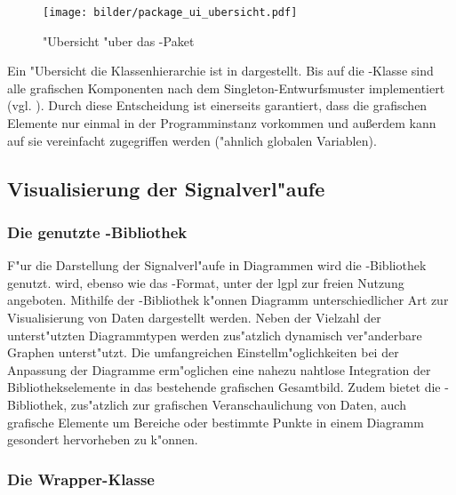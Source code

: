 \begin{figure}[htb]
\centering
\texttt{[image: bilder/package\_ui\_ubersicht.pdf]}
\caption{"Ubersicht "uber das -Paket}
\label{pic:package_ui_ubersicht}
\end{figure}

Ein "Ubersicht die Klassenhierarchie ist in  dargestellt.
Bis auf die -Klasse sind alle grafischen Komponenten nach dem Singleton-Entwurfsmuster implementiert (vgl. ).
Durch diese Entscheidung ist einerseits garantiert, dass die grafischen Elemente nur einmal in der Programminstanz vorkommen und au{\ss}erdem kann auf sie vereinfacht zugegriffen werden ("ahnlich globalen Variablen).


\subsection{Visualisierung der Signalverl"aufe}

\subsubsection{Die genutzte \jfcNS-Bibliothek}

F"ur die Darstellung der Signalverl"aufe in Diagrammen wird die \javaNS-Bibliothek \jfc genutzt.
\jfc wird, ebenso wie das \usNS-Format, unter der \ac{lgpl} zur freien Nutzung angeboten.
Mithilfe der \jfcNS-Bibliothek k"onnen Diagramm unterschiedlicher Art zur Visualisierung von Daten dargestellt werden.
Neben der Vielzahl der unterst"utzten Diagrammtypen werden zus"atzlich dynamisch ver"anderbare Graphen unterst"utzt.
Die umfangreichen Einstellm"oglichkeiten bei der Anpassung der Diagramme erm"oglichen eine nahezu nahtlose Integration der Bibliothekselemente in das bestehende grafischen Gesamtbild.
Zudem bietet die \jfcNS-Bibliothek, zus"atzlich zur grafischen Veranschaulichung von Daten, auch grafische Elemente um Bereiche oder bestimmte Punkte in einem Diagramm gesondert hervorheben zu k"onnen.


\subsubsection{Die Wrapper-Klasse }

